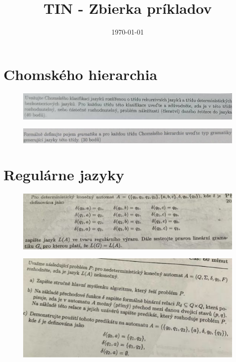 \documentclass[]{article}
\begin{document}
	
	
	\title{TIN - Zbierka príkladov}
	\date{\today}
	
	\maketitle
	\newpage
	\tableofcontents
	\newpage
	
	\section{Chomského hierarchia}
	
	\begin{figure}[H]
		\includegraphics[width=\textwidth]{tasks/chomsky/task1.png}
	\end{figure}
	
	\begin{figure}[H]
		\includegraphics[width=\textwidth]{tasks/chomsky/task2.png}
	\end{figure}

	\section{Regulárne jazyky}
	
	\begin{figure}[H]
		\includegraphics[width=\textwidth]{tasks/regularne/task1.png}
	\end{figure}
	
	\begin{figure}[H]
		\includegraphics[width=\textwidth]{tasks/regularne/task2.png}
	\end{figure}
	
\end{document}
